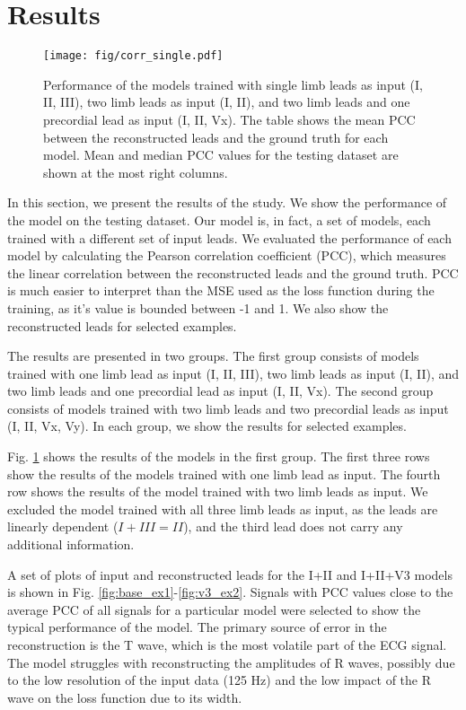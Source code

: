 \documentclass[preprint,12pt]{elsarticle}
\begin{document}
\section{Results}

\begin{figure}[h]
    \centering
    \texttt{[image: fig/corr\_single.pdf]}
    \caption{Performance of the models trained with single limb leads as input (I, II, III), two limb leads as input (I, II), and two limb leads and one precordial lead as input (I, II, Vx). The table shows the mean PCC between the reconstructed leads and the ground truth for each model. Mean and median PCC values for the testing dataset are shown at the most right columns.}\label{fig:single}
\end{figure}

In this section, we present the results of the study. We show the performance of the model on the testing dataset. Our model is, in fact, a set of models, each trained with a different set of input leads. We evaluated the performance of each model by calculating the Pearson correlation coefficient (PCC), which measures the linear correlation between the reconstructed leads and the ground truth. PCC is much easier to interpret than the MSE used as the loss function during the training, as it's value is bounded between -1 and 1. We also show the reconstructed leads for selected examples.

The results are presented in two groups. The first group consists of models trained with one limb lead as input (I, II, III), two limb leads as input (I, II), and two limb leads and one precordial lead as input (I, II, Vx). The second group consists of models trained with two limb leads and two precordial leads as input (I, II, Vx, Vy). In each group, we show the results for selected examples.

Fig. \ref{fig:single} shows the results of the models in the first group. The first three rows show the results of the models trained with one limb lead as input. The fourth row shows the results of the model trained with two limb leads as input. We excluded the model trained with all three limb leads as input, as the leads are linearly dependent ($I + III = II$), and the third lead does not carry any additional information.

A set of plots of input and reconstructed leads for the I+II and I+II+V3 models is shown in Fig. \ref{fig:base_ex1}-\ref{fig:v3_ex2}. Signals with PCC values close to the average PCC of all signals for a particular model were selected to show the typical performance of the model. The primary source of error in the reconstruction is the T wave, which is the most volatile part of the ECG signal. The model struggles with reconstructing the amplitudes of R waves, possibly due to the low resolution of the input data (125 Hz) and the low impact of the R wave on the loss function due to its width.
\end{document}
